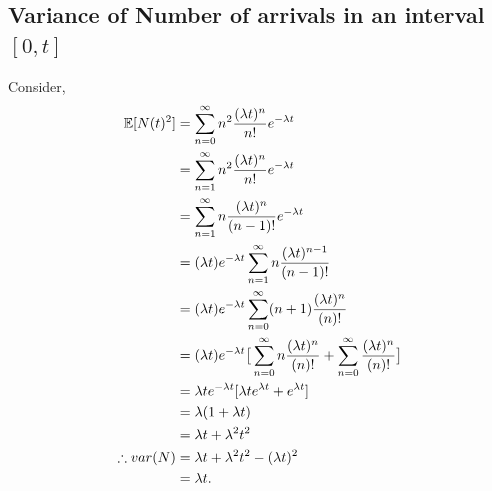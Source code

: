 \documentclass[11pt, a4paper]{report}
\begin{document}
\subsection{Variance of Number of arrivals in an interval $
[0, t]$}
Consider,
\begin{subequations}
    \begin{align}
        {\mathbb{E}}[N(t)^2] &= \sum_{n=0}^{\infty} n^2 \frac{(\lambda t)^n}{n!}e^{-\lambda t} \\
        &= \sum_{n=1}^{\infty} n^2 \frac{(\lambda t)^n}{n!}e^{-\lambda t} \\
        &= \sum_{n=1}^{\infty} n \frac{(\lambda t)^n}{(n-1)!}e^{-\lambda t} \\
        &= (\lambda t)e^{-\lambda t} \sum_{n=1}^{\infty}n \frac{(\lambda t)^{n-1}}{(n-1)!} \\
        &= (\lambda t)e^{-\lambda t} \sum_{n=0}^{\infty}(n+1) \frac{(\lambda t)^{n}}{(n)!} \\
        &= (\lambda t)e^{-\lambda t} \big[\sum_{n=0}^{\infty}n \frac{(\lambda t)^{n}}{(n)!}+ \sum_{n=0}^{\infty} \frac{(\lambda t)^{n}}{(n)!}\big] \\
        &= \lambda t e^{-\lambda t} [\lambda t e ^{\lambda t} + e^{\lambda t}] \\
        &= \lambda (1 + \lambda t) \\
        &= \lambda t + \lambda^2 t^2 \\
        \therefore var(N) &= \lambda t + \lambda^2 t^2 - (\lambda t)^2 \\
        &= \lambda t.
    \end{align}
    \label{eq:varArrivals}
\end{subequations}
\end{document}
